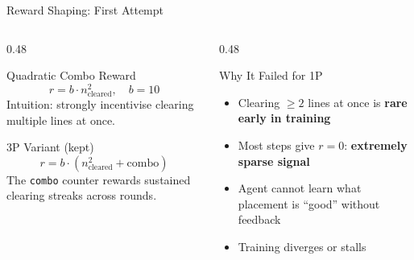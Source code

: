\documentclass[aspectratio=169,10pt]{beamer}
\begin{document}
\begin{frame}{Reward Shaping: First Attempt}
\begin{columns}[T]
\begin{column}{0.48\textwidth}
\begin{block}{Quadratic Combo Reward}
\[
r = b \cdot n_{\text{cleared}}^2, \quad b = 10
\]
\vspace{0.2em}
Intuition: strongly incentivise clearing multiple lines at once.
\end{block}

\vspace{0.5em}
\begin{exampleblock}{3P Variant (kept)}
\[
r = b \cdot (n_{\text{cleared}}^2 + \text{combo})
\]
The \texttt{combo} counter rewards sustained clearing streaks across rounds.
\end{exampleblock}
\end{column}

\begin{column}{0.48\textwidth}
\begin{alertblock}{Why It Failed for 1P}
\begin{itemize}
    \item Clearing $\geq 2$ lines at once is \textbf{rare early in training}
    \item Most steps give $r = 0$: \textbf{extremely sparse signal}
    \item Agent cannot learn what placement is ``good'' without feedback
    \item Training diverges or stalls
\end{itemize}
\end{alertblock}
\end{column}
\end{columns}
\end{frame}
\end{document}
